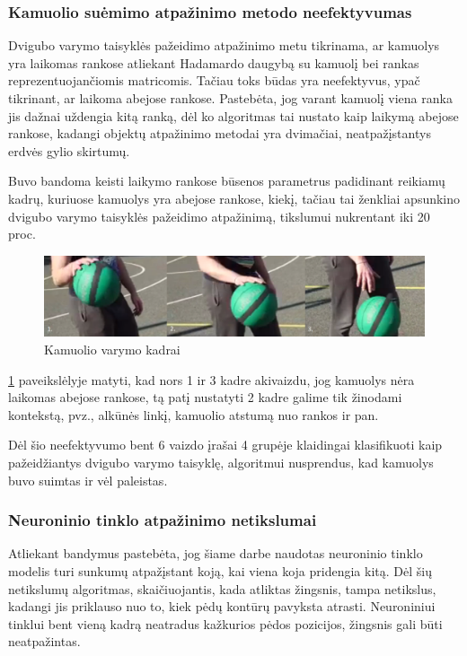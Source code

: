 \documentclass{VUMIFPSbakalaurinis}
\begin{document}
\subsubsection{Kamuolio suėmimo atpažinimo metodo neefektyvumas}

Dvigubo varymo taisyklės pažeidimo atpažinimo metu tikrinama, ar kamuolys yra laikomas rankose atliekant Hadamardo daugybą su kamuolį bei rankas reprezentuojančiomis matricomis. Tačiau toks būdas yra neefektyvus, ypač tikrinant, ar laikoma abejose rankose. Pastebėta, jog varant kamuolį viena ranka jis dažnai uždengia kitą ranką, dėl ko algoritmas tai nustato kaip laikymą abejose rankose, kadangi objektų atpažinimo metodai yra dvimačiai, neatpažįstantys erdvės gylio skirtumų.

Buvo bandoma keisti laikymo rankose būsenos parametrus padidinant reikiamų kadrų, kuriuose kamuolys yra abejose rankose, kiekį, tačiau tai ženkliai apsunkino dvigubo varymo taisyklės pažeidimo atpažinimą, tikslumui nukrentant iki 20 proc.

\begin{figure}[H]
	\centering
	\includegraphics[scale=0.3]{img/double_dribble_fault.png}
	\caption{ Kamuolio varymo kadrai }
	\label{img:double_dribble_fault}
\end{figure}

\ref{img:double_dribble_fault} paveikslėlyje matyti, kad nors 1 ir 3 kadre akivaizdu, jog kamuolys nėra laikomas abejose rankose, tą patį nustatyti 2 kadre galime tik žinodami kontekstą, pvz., alkūnės linkį, kamuolio atstumą nuo rankos ir pan.  

Dėl šio neefektyvumo bent 6 vaizdo įrašai 4 grupėje klaidingai klasifikuoti kaip pažeidžiantys dvigubo varymo taisyklę, algoritmui nusprendus, kad kamuolys buvo suimtas ir vėl paleistas. 

\subsubsection{Neuroninio tinklo atpažinimo netikslumai}

Atliekant bandymus pastebėta, jog šiame darbe naudotas neuroninio tinklo modelis turi sunkumų atpažįstant koją, kai viena koja pridengia kitą. Dėl šių netikslumų algoritmas, skaičiuojantis, kada atliktas žingsnis, tampa netikslus, kadangi jis priklauso nuo to, kiek pėdų kontūrų pavyksta atrasti. Neuroniniui tinklui bent vieną kadrą neatradus kažkurios pėdos pozicijos, žingsnis gali būti neatpažintas. 
\end{document}
